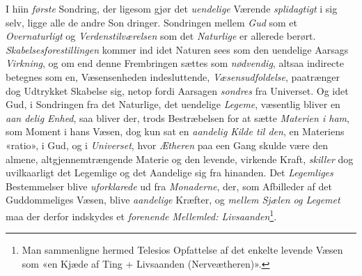 I hiin \emph{første} Sondring, der ligesom gjør det \emph{uendelige}
Værende \emph{splidagtigt} i sig selv, ligge alle de andre Son\-%
dringer. Sondringen mellem \emph{Gud} som et \emph{Overnaturligt}
og \emph{Verdenstilværelsen} som det \emph{Naturlige} er allerede
berørt. \emph{Skabelsesforestillingen} kommer ind idet Naturen
sees som den uendelige Aarsags \emph{Virkning}, og om end denne
Frembringen sættes som \emph{nødvendig}, altsaa indirecte betegnes
som en, Væsensenheden indesluttende, \emph{Væsensudfoldelse},
paatrænger dog Udtrykket Skabelse sig, netop fordi Aarsagen
\emph{sondres} fra Universet. Og idet Gud, i Sondringen fra det
 \setcounter{footnote}{0}
Naturlige, det uendelige \emph{Legeme}, væsentlig bliver en \emph{aan\-%
delig Enhed}, saa bliver der, trods Bestræbelsen for at sætte
\emph{Materien i ham}, som Moment i hans Væsen, dog kun sat
en \emph{aandelig Kilde til den}, en Materiens «ratio», i Gud,
og i \emph{Universet}, hvor \emph{Ætheren} paa een Gang skulde være
den almene, altgjennemtrængende Materie og den levende,
virkende Kraft, \emph{skiller} dog uvilkaarligt det Legemlige og det
Aandelige sig fra hinanden. Det \emph{Legemliges} Bestemmelser
blive \emph{uforklarede} ud fra \emph{Monaderne}, der, som Afbilleder
af det Guddommeliges Væsen, blive \emph{aandelige} Kræfter, og
\emph{mellem Sjælen og Legemet} maa der derfor indskydes et
\emph{forenende Mellemled: Livsaanden}\footnote{Man sammenligne hermed Telesios Opfattelse af det enkelte levende
Væsen som «en Kjæde af Ting + Livsaanden (Nerveætheren)».}.


